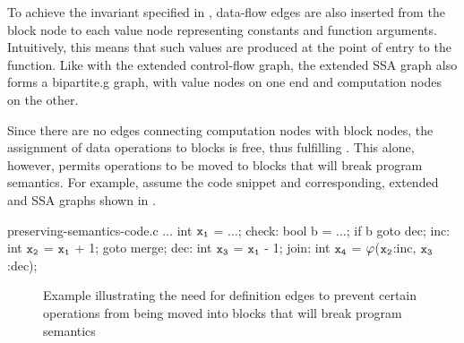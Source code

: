 To achieve the invariant specified in
, \glspl{data-flow
  edge} are also inserted from the  \gls{block node} to
each \gls{value node} representing constants and function arguments.
%
Intuitively, this means that such values are produced at the point of entry to
the \gls{function}.
%
Like with the extended \gls{control-flow graph}, the extended \gls{SSA graph}
also forms a \gls{bipartite.g} \gls{graph}, with \glspl{value node} on one end
and \glspl{computation node} on the other.

Since there are no \glspl{edge} connecting \glspl{computation node} with
\glspl{block node}, the assignment of data \glspl{operation} to \glspl{block} is
free, thus fulfilling .
%
This alone, however, permits \glspl{operation} to be moved to \glspl{block} that
will break \gls{program} semantics.
%
For example, assume the code snippet and corresponding, extended
 and \glspl{SSA graph} shown in
.
%
\begin{filecontents*}{preserving-semantics-code.c}
  $\ldots$
  int $\irVar{x}[1]$ = $\ldots$;
check:
  bool b = $\ldots$;
  if b goto dec;
inc:
  int $\irVar{x}[2]$ = $\irVar{x}[1]$ + 1;
  goto merge;
dec:
  int $\irVar{x}[3]$ = $\irVar{x}[1]$ - 1;
join:
  int $\irVar{x}[4]$ = $\mPhi$($\irVar{x}[2]$:inc, $\irVar{x}[3]$:dec);
\end{filecontents*}
%
\begin{figure}
  \centering

  \mbox{}%
  \hfill%
  \hfill\hfill\hfill%
  \hfill%
  \mbox{}

  \caption[Example illustrating the need for definition edges]%
          {%
            Example illustrating the need for definition edges to prevent
            certain operations from being moved into blocks that will break
            program semantics%
          }
\end{figure}
